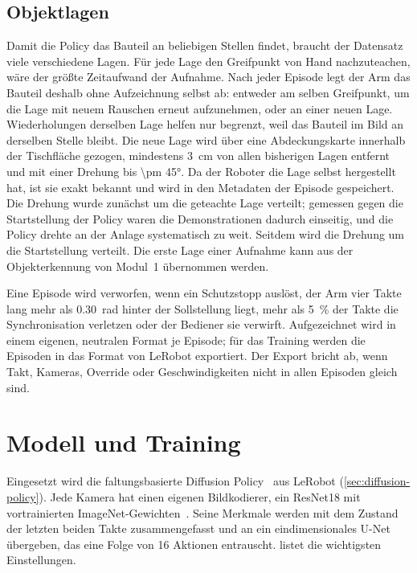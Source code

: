 \subsection{Objektlagen}

Damit die Policy das Bauteil an beliebigen Stellen findet, braucht der Datensatz viele
verschiedene Lagen. Für jede Lage den Greifpunkt von Hand nachzuteachen, wäre der größte
Zeitaufwand der Aufnahme. Nach jeder Episode legt der Arm das Bauteil deshalb ohne Aufzeichnung
selbst ab: entweder am selben Greifpunkt, um die Lage mit neuem Rauschen erneut aufzunehmen, oder
an einer neuen Lage. Wiederholungen derselben Lage helfen nur begrenzt, weil das Bauteil im Bild
an derselben Stelle bleibt. Die neue Lage wird über eine Abdeckungskarte innerhalb der Tischfläche
gezogen, mindestens \SI{3}{\centi\metre} von allen bisherigen Lagen entfernt und mit einer
Drehung bis \ang{\pm 45}. Da der Roboter die Lage selbst hergestellt hat, ist sie exakt bekannt
und wird in den Metadaten der Episode gespeichert. Die Drehung wurde zunächst um die geteachte
Lage verteilt; gemessen gegen die Startstellung der Policy waren die Demonstrationen dadurch
einseitig, und die Policy drehte an der Anlage systematisch zu weit. Seitdem wird die Drehung um
die Startstellung verteilt. Die erste Lage einer Aufnahme kann aus der Objekterkennung von
Modul~1 übernommen werden.

Eine Episode wird verworfen, wenn ein Schutzstopp auslöst, der Arm vier Takte lang mehr als
\SI{0.30}{rad} hinter der Sollstellung liegt, mehr als \SI{5}{\percent} der Takte die
Synchronisation verletzen oder der Bediener sie verwirft. Aufgezeichnet wird in einem eigenen,
neutralen Format je Episode; für das Training werden die Episoden in das Format von LeRobot
exportiert. Der Export bricht ab, wenn Takt, Kameras, Override oder Geschwindigkeiten nicht in
allen Episoden gleich sind.

\section{Modell und Training}
\label{sec:m4-training}

Eingesetzt wird die faltungsbasierte Diffusion Policy~\cite{chi2024} aus LeRobot
(\cref{sec:diffusion-policy}). Jede Kamera hat einen eigenen Bildkodierer, ein ResNet18 mit
vortrainierten ImageNet-Gewichten~\cite{he2016}. Seine Merkmale werden mit dem Zustand der
letzten beiden Takte zusammengefasst und an ein eindimensionales U-Net übergeben, das eine
Folge von 16 Aktionen entrauscht.  listet die wichtigsten Einstellungen.


